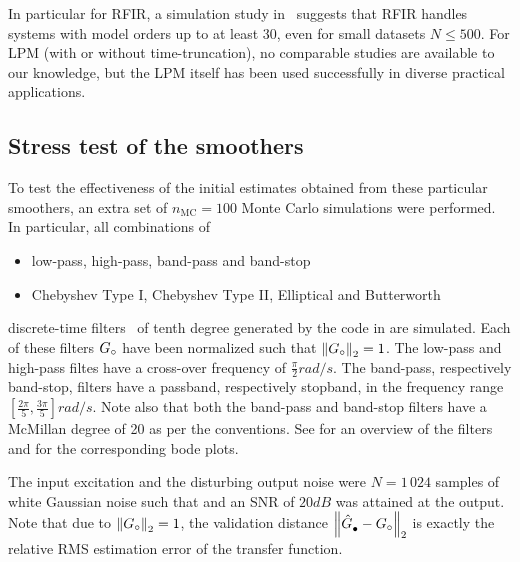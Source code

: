 In particular for RFIR, a simulation study in~\citep{Chen2013} suggests that RFIR handles systems with model orders up to at least $30$, even for small datasets $N\leq 500$.
For LPM (with or without time-truncation), no comparable studies are available to our knowledge, but the LPM itself has been used successfully in diverse practical applications.

\subsection{Stress test of the smoothers}
To test the effectiveness of the initial estimates obtained from these particular smoothers, an extra set of $n_{\mathrm{MC}} = 100$ Monte Carlo simulations were performed.
In particular, all combinations of
\begin{itemize}
  \item low-pass, high-pass, band-pass and band-stop 
  \item Chebyshev Type I, Chebyshev Type II, Elliptical and Butterworth
\end{itemize}
discrete-time filters~\citep{Zverev1967} of tenth degree generated by the \MATLAB code in  are simulated.
Each of these filters $\true{G}$ have been normalized such that $\norm[2]{\true{G}} = 1$.
The low-pass and high-pass filtes have a cross-over frequency of $\frac{\pi}{2} \unit{rad/s}$. 
The band-pass, respectively band-stop, filters have a passband, respectively stopband, in the frequency range$\left[ \frac{2\pi}{5}, \frac{3\pi}{5}\right] \unit{rad/s}$.
Note also that both the band-pass and band-stop filters have a McMillan degree of 20 as per the \MATLAB conventions.
See  for an overview of the filters and   for the corresponding bode plots.



The input excitation and the disturbing output noise were $N=1\,024$ samples of white Gaussian noise such that and an \gls{SNR} of $20 \unit{dB}$ was attained at the output.
Note that due to $\norm[2]{\true{G}}=1$, the validation distance $\norm[2]{\model{\bullet} - \true{G}}$ is exactly the relative \gls{RMS} estimation error of the transfer function.

